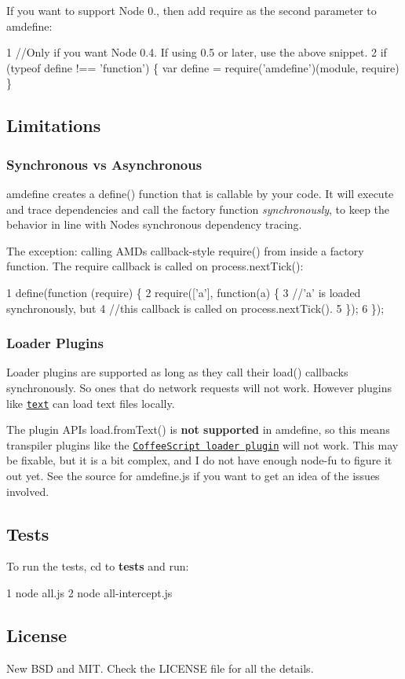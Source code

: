 If you want to support Node 0., then add {\ttfamily require} as the second parameter to amdefine\+:


\begin{DoxyCode}
1 //Only if you want Node 0.4. If using 0.5 or later, use the above snippet.
2 if (typeof define !== 'function') \{ var define = require('amdefine')(module, require) \}
\end{DoxyCode}


\subsection*{Limitations}

\subsubsection*{Synchronous vs Asynchronous}

amdefine creates a define() function that is callable by your code. It will execute and trace dependencies and call the factory function {\itshape synchronously}, to keep the behavior in line with Node\textquotesingle{}s synchronous dependency tracing.

The exception\+: calling A\+M\+D\textquotesingle{}s callback-\/style require() from inside a factory function. The require callback is called on process.\+next\+Tick()\+:


\begin{DoxyCode}
1 define(function (require) \{
2     require(['a'], function(a) \{
3         //'a' is loaded synchronously, but
4         //this callback is called on process.nextTick().
5     \});
6 \});
\end{DoxyCode}


\subsubsection*{Loader Plugins}

Loader plugins are supported as long as they call their load() callbacks synchronously. So ones that do network requests will not work. However plugins like \href{http://requirejs.org/docs/api.html#text}{\tt text} can load text files locally.

The plugin A\+P\+I\textquotesingle{}s {\ttfamily load.\+from\+Text()} is {\bfseries not supported} in amdefine, so this means transpiler plugins like the \href{https://github.com/jrburke/require-cs}{\tt Coffee\+Script loader plugin} will not work. This may be fixable, but it is a bit complex, and I do not have enough node-\/fu to figure it out yet. See the source for amdefine.\+js if you want to get an idea of the issues involved.

\subsection*{Tests}

To run the tests, cd to {\bfseries tests} and run\+:


\begin{DoxyCode}
1 node all.js
2 node all-intercept.js
\end{DoxyCode}


\subsection*{License}

New B\+S\+D and M\+I\+T. Check the L\+I\+C\+E\+N\+S\+E file for all the details. 